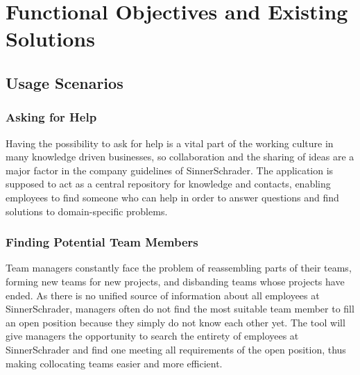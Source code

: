 \chapter{Functional Objectives and Existing Solutions}

\section{Usage Scenarios}
\label{usecases}
\subsection{Asking for Help}
Having the possibility to ask for help is a vital part of the working culture in many knowledge driven
businesses, so collaboration and the sharing of ideas are a major factor in the company guidelines
of SinnerSchrader. The application is supposed to act as a central repository for knowledge and contacts,
enabling employees to find someone who can help in order to answer questions and find solutions to domain-specific problems.

\subsection{Finding Potential Team Members}
Team managers constantly face the problem of reassembling parts of their teams, forming new teams for new projects, and
disbanding teams whose projects have ended. As there is no unified source of information about all employees at SinnerSchrader, managers often
do not find the most suitable team member to fill an open position because they simply do not know each other yet.
The tool will give managers the opportunity to search the entirety of employees at SinnerSchrader and find one
meeting all requirements of the open position, thus making collocating teams easier and more efficient.

\newpage

